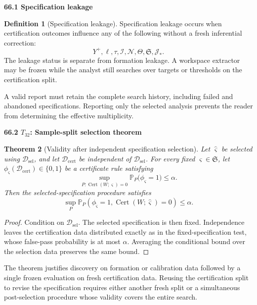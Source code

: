 \documentclass[11pt,letterpaper]{article}
\newcommand{\subtopic}[1]{%
 \vspace{0.45em}
 {\bfseries\color{AccentColor} #1\par}
}
\theoremstyle{plain}
\newtheorem{theorem}{Theorem}
\theoremstyle{definition}
\newtheorem{definition}[theorem]{Definition}
\begin{document}
\subtopic{66.1 Specification leakage}

\begin{definition}[Specification leakage]
Specification leakage occurs when certification outcomes influence any of the
following without a fresh inferential correction:
\[
Y^+,
\ell,
\tau,
\mathcal I,
\mathcal N,
\Theta,
\mathfrak S,
\mathcal J_*.
\]
The leakage status is separate from formation leakage. A workspace extractor
may be frozen while the analyst still searches over targets or thresholds on
the certification split.
\end{definition}

A valid report must retain the complete search history, including failed and
abandoned specifications. Reporting only the selected analysis prevents the
reader from determining the effective multiplicity.

\subtopic{66.2 \(T_{32}\): Sample-split selection theorem}

\begin{theorem}[Validity after independent specification selection]
\label{thm:sample-split-spec-selection}
Let \(\widehat\varsigma\) be selected using
\(\mathcal D_{\mathrm{sel}}\), and let
\(\mathcal D_{\mathrm{cert}}\) be independent of
\(\mathcal D_{\mathrm{sel}}\). For every fixed
\(\varsigma\in\mathfrak S\), let
\(\phi_\varsigma(\mathcal D_{\mathrm{cert}})\in\{0,1\}\) be a certificate
rule satisfying
\[
\sup_{P:\operatorname{Cert}(W;\varsigma)=0}
\mathbb P_P\bigl(\phi_\varsigma=1\bigr)
\leq\alpha.
\]
Then the selected-specification procedure satisfies
\[
\boxed{
\sup_P
\mathbb P_P\left(
\phi_{\widehat\varsigma}=1,
\operatorname{Cert}(W;\widehat\varsigma)=0
\right)
\leq\alpha.
}
\]
\end{theorem}

\begin{proof}
Condition on \(\mathcal D_{\mathrm{sel}}\). The selected specification is then
fixed. Independence leaves the certification data distributed exactly as in
the fixed-specification test, whose false-pass probability is at most
\(\alpha\). Averaging the conditional bound over the selection data preserves
the same bound.
\end{proof}

The theorem justifies discovery on formation or calibration data followed by a
single frozen evaluation on fresh certification data. Reusing the
certification split to revise the specification requires either another fresh
split or a simultaneous post-selection procedure whose validity covers the
entire search.
\end{document}
